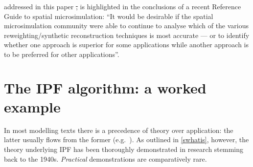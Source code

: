 \documentclass[a4paper,10pt]{article}
\providecommand{\DIFaddtex}[1]{{\protect\color{blue}\uwave{#1}}} %
\providecommand{\DIFdeltex}[1]{{\protect\color{red}\sout{#1}}}                      %
\providecommand{\DIFaddend}{} %
\providecommand{\DIFdelbegin}{} %
\providecommand{\DIFdelend}{} %
\providecommand{\DIFadd}[1]{\texorpdfstring{\DIFaddtex{#1}}{#1}} %
\providecommand{\DIFdel}[1]{\texorpdfstring{\DIFdeltex{#1}}{}} %
\begin{document}
\DIFadd{The research gap }\DIFaddend addressed in this paper \DIFdelbegin \DIFdel{, }\DIFdelend is highlighted
in the conclusions of a recent Reference Guide to spatial microsimulation:
``It would be desirable if the spatial microsimulation community were able to continue to
analyse which of the various reweighting/synthetic reconstruction techniques is most accurate
--- or to identify whether one approach is superior for some applications while another
approach is to be preferred for other applications''.



%
\section{The IPF algorithm: a worked example} \label{s:theory}
In most modelling texts there is a precedence of theory over
application: the latter usually flows from the former
(e.g.~\citealp{batty1976urban}).
As outlined in \cref{swhatis}, however, the theory underlying IPF has
been thoroughly demonstrated in research stemming back to the 1940s.
\emph{Practical} demonstrations
are comparatively rare.
\end{document}
